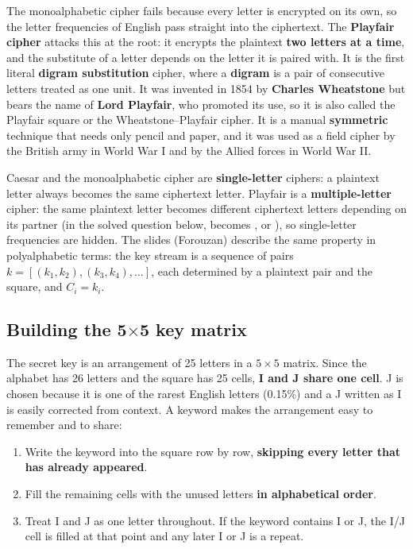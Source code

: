 The monoalphabetic cipher fails because every letter is encrypted on its own, so the letter frequencies of English pass straight into the ciphertext. The \textbf{Playfair cipher} attacks this at the root: it encrypts the plaintext \textbf{two letters at a time}, and the substitute of a letter depends on the letter it is paired with. It is the first literal \textbf{digram substitution} cipher, where a \textbf{digram} is a pair of consecutive letters treated as one unit. It was invented in 1854 by \textbf{Charles Wheatstone} but bears the name of \textbf{Lord Playfair}, who promoted its use, so it is also called the Playfair square or the Wheatstone--Playfair cipher. It is a manual \textbf{symmetric} technique that needs only pencil and paper, and it was used as a field cipher by the British army in World War I and by the Allied forces in World War II.

Caesar and the monoalphabetic cipher are \textbf{single-letter} ciphers: a plaintext letter always becomes the same ciphertext letter. Playfair is a \textbf{multiple-letter} cipher: the same plaintext letter becomes different ciphertext letters depending on its partner (in the solved question below,  becomes ,  or ), so single-letter frequencies are hidden. The slides (Forouzan) describe the same property in polyalphabetic terms: the key stream is a sequence of pairs $k = [(k_1, k_2), (k_3, k_4), \dots]$, each determined by a plaintext pair and the square, and $C_i = k_i$.

\subsection{Building the 5$\times$5 key matrix}
The secret key is an arrangement of 25 letters in a $5 \times 5$ matrix. Since the alphabet has 26 letters and the square has 25 cells, \textbf{I and J share one cell}. J is chosen because it is one of the rarest English letters (0.15\%) and a J written as I is easily corrected from context. A keyword makes the arrangement easy to remember and to share:
\begin{enumerate}[leftmargin=1.5em]
  \item Write the keyword into the square row by row, \textbf{skipping every letter that has already appeared}.
  \item Fill the remaining cells with the unused letters \textbf{in alphabetical order}.
  \item Treat I and J as one letter throughout. If the keyword contains I or J, the I/J cell is filled at that point and any later I or J is a repeat.
\end{enumerate}

